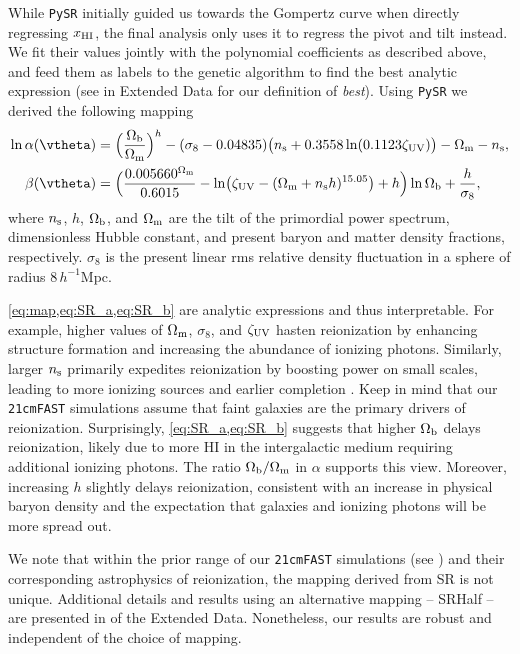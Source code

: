 While \texttt{PySR} initially guided us towards the Gompertz curve when
directly regressing $x_{\mathrm{HI}}$, the final analysis only uses it to regress
the pivot and tilt instead.
We fit their values jointly with the polynomial coefficients as
described above, and feed them as labels to the genetic algorithm to
find the best analytic expression (see  in Extended
Data for our definition of \emph{best}).
Using \texttt{PySR} we derived the following mapping
%
\begin{align}
\label{eq:SR_a}
\ln\ap(\vtheta) &= \Bigl(\frac{\Omegab}{\Omegam}\Bigr)^h
  - (\sigma_8 - 0.04835) \bigl(\ns + 0.3558 \ln(0.1123 \zetaUV)\bigr)
  - \Omegam - \ns, \\
%
\label{eq:SR_b}
\beta(\vtheta) &= \Bigl( \frac{0.005660^{\Omegam}}{0.6015}
    - \ln\bigl(\zetaUV - (\Omegam + \ns h)^{15.05}\bigr) + h \Bigr)
  \ln{\Omegab} + \frac{h}{\sigma_8},
\end{align}
where $n_\mathrm{s}$, $h$, $\Omega_\mathrm{b}$, and $\Omega_\mathrm{m}$ are the tilt of the
primordial power spectrum, dimensionless Hubble constant, and present
baryon and matter density fractions, respectively.
$\sigma_8$ is the present linear rms relative density fluctuation in a
sphere of radius $8 \, h^{-1}$Mpc.

\cref{eq:map,eq:SR_a,eq:SR_b} are analytic expressions and thus
interpretable.
For example, higher values of $\Omega_\mathrm{m}$, $\sigma_8$, and $\zeta_\mathrm{UV}$
hasten reionization by enhancing structure formation and increasing the
abundance of ionizing photons.
Similarly, larger $n_\mathrm{s}$ primarily expedites reionization by boosting
power on small scales, leading to more ionizing sources and earlier
completion \cite{Montero2021}.
Keep in mind that our \texttt{21cmFAST} simulations assume that faint
galaxies are the primary drivers of reionization.
Surprisingly, \cref{eq:SR_a,eq:SR_b} suggests that higher $\Omega_\mathrm{b}$
delays reionization, likely due to more HI in the intergalactic medium
requiring additional ionizing photons.
The ratio $\Omega_\mathrm{b}/\Omega_\mathrm{m}$ in $\alpha$ supports this view.
Moreover, increasing $h$ slightly delays reionization, consistent with
an increase in physical baryon density and
the expectation that galaxies and ionizing photons will be more spread
out.

We note that within the prior range of our \texttt{21cmFAST} simulations
(see ) and their corresponding astrophysics of
reionization, the mapping derived from SR is not unique.
Additional details and results using an alternative mapping -- SRHalf --
are presented in  of the Extended Data.
Nonetheless, our results are robust and independent of the choice of
mapping.

